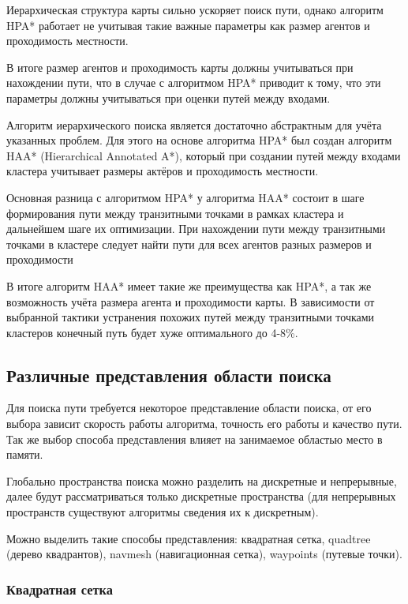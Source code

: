 Иерархическая структура карты сильно ускоряет поиск пути, однако алгоритм HPA* работает не учитывая такие важные параметры как размер агентов и проходимость местности.  

В итоге размер агентов и проходимость карты должны учитываться при нахождении пути, что в случае с алгоритмом HPA* приводит к тому, что эти параметры должны учитываться при оценки путей между входами.

Алгоритм иерархического поиска является достаточно абстрактным для учёта указанных проблем. Для этого на основе алгоритма HPA* был создан алгоритм HAA* (Hierarchical Annotated A*), который при создании путей между входами кластера учитывает размеры актёров и проходимость местности.

Основная разница с алгоритмом HPA* у алгоритма HAA* состоит в шаге формирования пути между транзитными точками в рамках кластера и дальнейшем шаге их оптимизации. При нахождении пути между транзитными точками в кластере следует найти пути для всех агентов разных размеров и проходимости 

В итоге алгоритм HAA* имеет такие же преимущества как HPA*, а так же возможность учёта размера агента и проходимости карты. В зависимости от выбранной тактики устранения похожих путей между транзитными точками кластеров конечный путь будет хуже оптимального до 4-8\%.


\subsection{Различные представления области поиска}

Для поиска пути требуется некоторое представление области поиска, от его выбора зависит скорость работы алгоритма, точность его работы и качество пути. Так же выбор способа представления влияет на занимаемое областью место в памяти. 

Глобально пространства поиска можно разделить на дискретные и непрерывные, далее будут рассматриваться только дискретные пространства (для непрерывных пространств существуют алгоритмы сведения их к дискретным).  

Можно выделить такие способы представления: квадратная сетка, quadtree (дерево квадрантов), navmesh (навигационная сетка), waypoints (путевые точки).

\subsubsection{Квадратная сетка}


